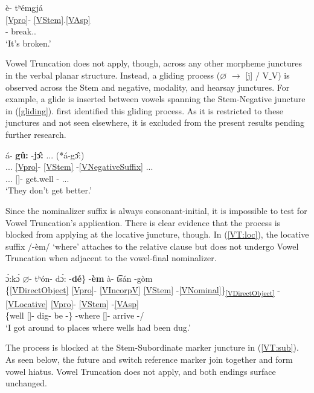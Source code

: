 \documentclass[output=paper]{langscibook}
\begin{document}
\ea \label{VT:aspect}
\glll è- tʰémgjá\\
{\ref{Vpro}}- \ref{VStem}.\ref{VAsp}\\
[\Third\Sg/\Aarg:\Inv/\Obj]- {break.{\Intr}.{\Pfv}} \\
\trans `It's broken.' \citep[adapted from][91]{Miller:2018} %
\z 

Vowel Truncation does not apply, though, across any other morpheme junctures in the verbal planar structure. Instead, a gliding process ($\varnothing$ $\rightarrow$ [j] / V$\_$V) is observed across the Stem and negative, modality, and hearsay junctures. For example, a glide is inserted between vowels spanning the Stem-Negative juncture in (\ref{gliding}). \citet{Miller:2018} first identified this gliding process. As it is restricted to these junctures and not seen elsewhere, it is excluded from the present results pending further research. 

\ea \label{gliding}
 á- \textbf{g\^u:} -\textbf{j\^{ɔ}:} {...} (*á-g\^{ɔ}:)\\
{...} {\ref{Vpro}}- \ref{VStem} -\ref{VNegativeSuffix} {...}\\
{...} [\Third\Pl]- get.well -{\Neg} {...}\\
\trans `They don't get better.' \citep[from][216]{Watkins:1984} %
\z 

Since the nominalizer suffix is always consonant-initial, it is impossible to test for Vowel Truncation's application. There is clear evidence that the process is blocked from applying at the locative juncture, though. In (\ref{VT:loc}), the locative suffix /-èm/ `where' attaches to the relative clause but does not undergo Vowel Truncation when adjacent to the vowel-final nominalizer.

\ea \label{VT:loc}
\glll {\{}\'{ɔ}:k\'{ɔ} $\varnothing$- tʰón- d\'{ɔ}: -\textbf{dé}{\}} -\textbf{èm} \`a- t͡sán -gòm \\
{\{}\ref{VDirectObject} {\ref{Vpro}}- \ref{VIncorpV} \ref{VStem} -\ref{VNominal}{\}}\textsubscript{\ref{VDirectObject}} -\ref{VLocative} {\ref{Vpro}}- \ref{VStem} -\ref{VAsp}\\
{\{}well [\Third\Sg]- dig- be -{\Nom}{\}} -where [\First\Sg]- arrive -\Distr/\Pfv \\
\trans `I got around to places where wells had been dug.' \citep[][180]{Watkins:1984} %
\z 

\noindent The process is blocked at the Stem-Subordinate marker juncture in (\ref{VT:sub}). As seen below, the future and switch reference marker join together and form vowel hiatus. Vowel Truncation does not apply, and both endings surface unchanged.
\end{document}

